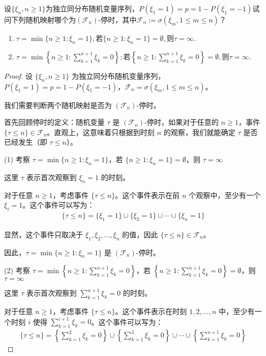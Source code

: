 \documentclass[lang=cn,10pt,thmcnt=section]{elegantbook}
\begin{document}
\begin{example}
	设$\{\xi_n, n \geq 1\}$为独立同分布随机变量序列，$P(\xi_1 = 1) = p = 1 - P(\xi_1 = -1)$试问下列随机映射哪个为$(\mathcal{F}_n)$-停时，其中$\mathcal{F}_n := \sigma(\xi_m, 1 \leq m \leq n)$？
    \begin{enumerate}
        \item $\tau = \min\{n \geq 1: \xi_n = 1\}; \text{若} \{n \geq 1: \xi_n = 1\} = \emptyset, \text{则} \tau = \infty.$
        \item $\tau = \min\left\{n \geq 1: \sum_{k=1}^{n+1} \xi_k = 0\right\}; \text{若} \left\{n \geq 1: \sum_{k=1}^{n+1} \xi_k = 0\right\} = \emptyset, \text{则} \tau = \infty.$
    \end{enumerate}
\end{example}
\begin{proof}
	设 $\{\xi_n, n \geq 1\}$ 为独立同分布随机变量序列，$P(\xi_1 = 1) = p = 1 - P(\xi_1 = -1)$，$\mathcal{F}_n = \sigma(\xi_m, 1 \leq m \leq n)$。

我们需要判断两个随机映射是否为 $(\mathcal{F}_n)$-停时。

首先回顾停时的定义：随机变量 $\tau$ 是 $(\mathcal{F}_n)$-停时，如果对于任意的 $n \geq 1$，事件 $\{\tau \leq n\} \in \mathcal{F}_n$。直观上，这意味着只根据到时刻 $n$ 的观察，我们就能确定 $\tau$ 是否已经发生（即 $\tau \leq n$）。

(1) 考察 $\tau = \min\{n \geq 1: \xi_n = 1\}$，若 $\{n \geq 1: \xi_n = 1\} = \emptyset$，则 $\tau = \infty$

这里 $\tau$ 表示首次观察到 $\xi_n = 1$ 的时刻。

对于任意 $n \geq 1$，考虑事件 $\{\tau \leq n\}$。这个事件表示在前 $n$ 个观察中，至少有一个 $\xi_i = 1$。这个事件可以写为：
\begin{align}
\{\tau \leq n\} = \{\xi_1 = 1\} \cup \{\xi_2 = 1\} \cup \cdots \cup \{\xi_n = 1\}
\end{align}

显然，这个事件只取决于 $\xi_1, \xi_2, \ldots, \xi_n$ 的值，因此 $\{\tau \leq n\} \in \mathcal{F}_n$。

因此，$\tau = \min\{n \geq 1: \xi_n = 1\}$ 是 $(\mathcal{F}_n)$-停时。

(2) 考察 $\tau = \min\left\{n \geq 1: \sum_{k=1}^{n+1} \xi_k = 0\right\}$，若 $\left\{n \geq 1: \sum_{k=1}^{n+1} \xi_k = 0\right\} = \emptyset$，则 $\tau = \infty$

这里 $\tau$ 表示首次观察到 $\sum_{k=1}^{n+1} \xi_k = 0$ 的时刻。

对于任意 $n \geq 1$，考虑事件 $\{\tau \leq n\}$。这个事件表示在时刻 $1, 2, \ldots, n$ 中，至少有一个时刻 $i$ 使得 $\sum_{k=1}^{i+1} \xi_k = 0$。这个事件可以写为：
\begin{align}
\{\tau \leq n\} = \left\{\sum_{k=1}^{2} \xi_k = 0\right\} \cup \left\{\sum_{k=1}^{3} \xi_k = 0\right\} \cup \cdots \cup \left\{\sum_{k=1}^{n+1} \xi_k = 0\right\}
\end{align}


\end{proof}
\end{document}
